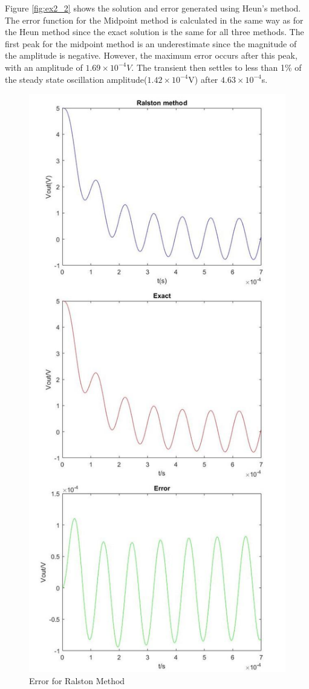 \documentclass[11pt, oneside, titlepage]{article}   	%
\begin{document}
Figure \ref{fig:ex2_2} shows the solution and error generated using Heun's method. The error function for the Midpoint method is calculated in the same way as for the Heun method since the exact solution is the same for all three methods. The first peak for the midpoint method is an underestimate since the magnitude of the amplitude is negative. However, the maximum error occurs after this peak, with an amplitude of $1.69\times10^{-4}V$. The transient then settles to less than 1\% of the steady state oscillation amplitude($1.42\times10^{-4}$V) after $4.63\times10^{-4}$s.

\begin{figure}[H]
\center
\includegraphics[scale = 0.35]{exercise2_3}
\caption{Error for Ralston Method} \label{fig:ex2_3}
\end{figure}
\end{document}
